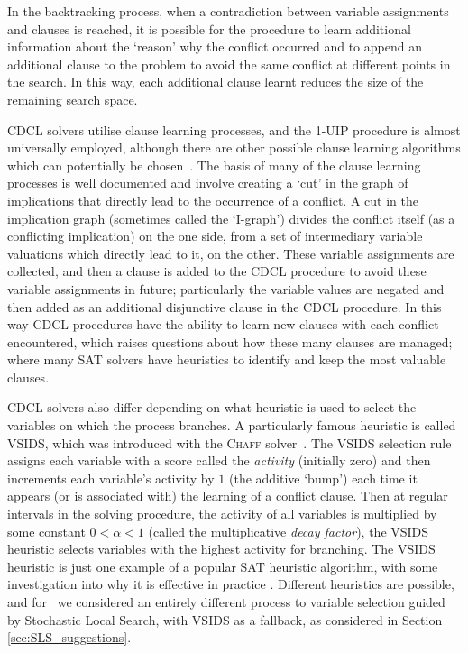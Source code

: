 \documentclass[
10pt, %
a4paper, %
oneside, %
headinclude,footinclude, %
BCOR5mm, %
]{scrartcl}
\begin{document}
In the backtracking process, when a contradiction between variable assignments and clauses is reached, it is possible for the procedure to learn additional information about the `reason' why the conflict occurred and to append an additional clause to the problem to avoid the same conflict at different points in the search.
In this way, each additional clause learnt reduces the size of the remaining search space.

CDCL solvers utilise clause learning processes, and the 1-UIP procedure is almost universally employed, although there are other possible clause learning algorithms which can potentially be chosen~\cite{10.1007/978-3-030-51825-7_3,968634}.
The basis of many of the clause learning processes is well documented and involve creating a `cut' in the graph of implications that directly lead to the occurrence of a conflict.
A cut in the implication graph (sometimes called the `I-graph') divides the conflict itself (as a conflicting implication) on the one side, 
from a set of intermediary variable valuations which directly lead to it, on the other.
These variable assignments are collected, and then a clause is added to the CDCL procedure to avoid these variable assignments in future; particularly the variable values are negated and then added as an additional disjunctive clause in the CDCL procedure.
In this way CDCL procedures have the ability to learn new clauses with each conflict encountered, which raises questions about how these many clauses are managed; where many SAT solvers have heuristics to identify and keep the most valuable clauses.

CDCL solvers also differ depending on what heuristic is used to select the variables on which the process branches.
 A particularly famous heuristic is called VSIDS, which was introduced with the \textsc{Chaff} solver~\cite{10.1145/378239.379017}.
The VSIDS selection rule assigns each variable with a score called the \textit{activity} (initially zero) and then increments each variable's activity by $1$ (the additive `bump') each time it appears (or is associated with) the learning of a conflict clause.
Then at regular intervals in the solving procedure, the activity of all variables is multiplied by some constant $0<\alpha<1$ (called the multiplicative \textit{decay factor}), the VSIDS heuristic selects variables with the highest activity for branching.
The VSIDS heuristic is just one example of a popular SAT heuristic algorithm, with some investigation into why it is effective in practice \cite{liang2015understanding}.
Different heuristics are possible, and for \dagster\  we considered an entirely different process to variable selection guided by Stochastic Local Search, with VSIDS
as a fallback, as considered in Section \ref{sec:SLS_suggestions}.
\end{document}
